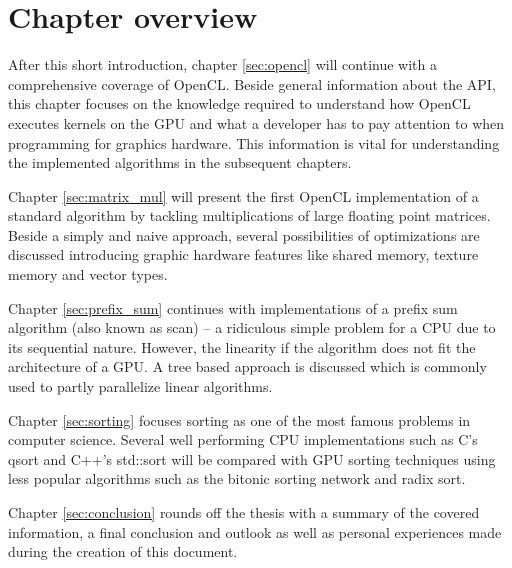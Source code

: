 \section{Chapter overview}

After this short introduction, chapter \ref{sec:opencl} will continue with a comprehensive coverage of OpenCL. Beside general information about the API, this chapter focuses on the knowledge required to understand how OpenCL executes kernels on the GPU and what a developer has to pay attention to when programming for graphics hardware. This information is vital for understanding the implemented algorithms in the subsequent chapters.

Chapter \ref{sec:matrix_mul} will present the first OpenCL implementation of a standard algorithm by tackling multiplications of large floating point matrices. Beside a simply and naive approach, several possibilities of optimizations are discussed introducing graphic hardware features like shared memory, texture memory and vector types.

Chapter \ref{sec:prefix_sum} continues with implementations of a prefix sum algorithm (also known as scan) -- a ridiculous simple problem for a CPU due to its sequential nature. However, the linearity if the algorithm does not fit the architecture of a GPU. A tree based approach is discussed which is commonly used to partly parallelize linear algorithms.

Chapter \ref{sec:sorting} focuses sorting as one of the most famous problems in computer science. Several well performing CPU implementations such as C's qsort and C++'s std::sort will be compared with GPU sorting techniques using less popular algorithms such as the bitonic sorting network and radix sort.

Chapter \ref{sec:conclusion} rounds off the thesis with a summary of the covered information, a final conclusion and outlook as well as personal experiences made during the creation of this document.
